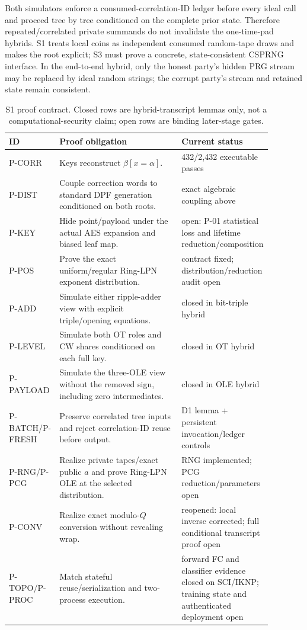\documentclass[11pt]{article}
\begin{document}
Both simulators enforce a consumed-correlation-ID ledger before every ideal
call and proceed tree by tree conditioned on the complete prior state.
Therefore repeated/correlated private summands do not invalidate the
one-time-pad hybrids. S1 treats local coins as independent consumed
random-tape draws and makes the root explicit; S3 must prove a concrete,
state-consistent CSPRNG interface. In the end-to-end hybrid, only the honest
party's hidden PRG stream may be replaced by ideal random strings; the corrupt
party's stream and retained state remain consistent.

\begin{table}[ht]
\centering
\scriptsize
\begin{tabular}{>{\raggedright\arraybackslash}p{0.12\linewidth}>{\raggedright\arraybackslash}p{0.58\linewidth}>{\raggedright\arraybackslash}p{0.18\linewidth}}
\toprule
ID & Proof obligation & Current status\\
\midrule
P-CORR & Keys reconstruct $\beta[x=\alpha]$. & 2{,}432/2{,}432 executable passes\\
P-DIST & Couple correction words to standard DPF generation conditioned on
both roots. & exact algebraic coupling above\\
P-KEY & Hide point/payload under the actual AES expansion and biased leaf map. &
open: P-01 statistical loss and lifetime reduction/composition\\
P-POS & Prove the exact uniform/regular Ring-LPN exponent distribution. &
contract fixed; distribution/reduction audit open\\
P-ADD & Simulate either ripple-adder view with explicit triple/opening
equations. & closed in bit-triple hybrid\\
P-LEVEL & Simulate both OT roles and CW shares conditioned on each full key. &
closed in OT hybrid\\
P-PAYLOAD & Simulate the three-OLE view without the removed sign, including
zero intermediates. & closed in OLE hybrid\\
P-BATCH/P-FRESH & Preserve correlated tree inputs and reject correlation-ID
reuse before output. & D1 lemma + persistent invocation/ledger controls\\
P-RNG/P-PCG & Realize private tapes/exact public $a$ and prove Ring-LPN OLE at
the selected distribution. & RNG implemented; PCG reduction/parameters open\\
P-CONV & Realize exact modulo-$Q$ conversion without revealing wrap. &
reopened: local inverse corrected; full conditional transcript proof open\\
P-TOPO/P-PROC & Match stateful reuse/serialization and two-process execution. &
forward FC and classifier evidence closed on SCI/IKNP; training state and
authenticated deployment open\\
\bottomrule
\end{tabular}
\caption{S1 proof contract. Closed rows are hybrid-transcript lemmas only,
not a computational-security claim; open rows are binding later-stage gates.}
\label{tab:s1proof}
\end{table}
\end{document}
